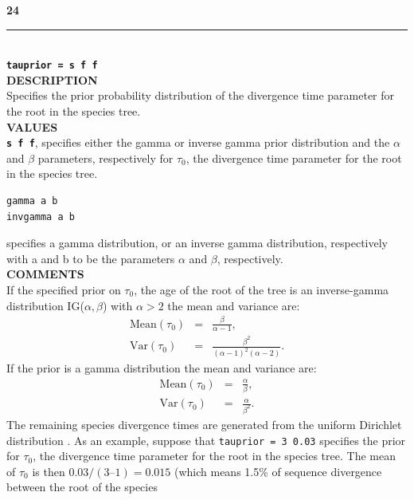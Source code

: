 \documentclass[a4paper]{book}
\numberwithin{equation}{section} \renewcommand{\baselinestretch}{0.55}
\begin{document}
\textbf{{\large 24}} \\
\noindent\rule{\textwidth}{0.8pt} \\
\textbf{{\Large \texttt{tauprior = s f f}}} \vspace{5pt}\\
\textbf{DESCRIPTION} \vspace{5pt}\\
Specifies the prior probability distribution of the divergence time
parameter for the root in the species tree.
\vspace{5pt}\\
\textbf{VALUES} \vspace{5pt}\\
\textbf{\texttt{s f f}}, specifies either the gamma or inverse gamma prior
distribution and the $\alpha$ and $\beta$ parameters,
respectively for $\tau_0$, the divergence time parameter for the root in the species
tree.
\begin{verbatim}
gamma a b
invgamma a b
\end{verbatim}
specifies a gamma distribution, or an inverse gamma distribution, respectively with
a and b to be the parameters $\alpha$ and $\beta$, respectively.
\vspace{5pt}\\
\textbf{COMMENTS} \vspace{5pt}\\
If the specified prior on $\tau_0$, the age of the root of the tree is an
inverse-gamma distribution IG($\alpha, \beta$) with $\alpha > 2$ the
mean and variance are:
\begin{eqnarray}
  \textrm{Mean}(\tau_0) & = & \frac{\beta}{\alpha - 1}, \nonumber \\
  \textrm{Var}(\tau_0) & = & \frac{\beta^2}{(\alpha - 1)^2 (\alpha - 2)}. \nonumber
\end{eqnarray}
If the prior is a gamma distribution the mean and variance are:
\begin{eqnarray}
  \textrm{Mean}(\tau_0) & = & \frac{\alpha}{\beta}, \nonumber \\
  \textrm{Var}(\tau_0) & = & \frac{\alpha}{\beta^2}. \nonumber
\end{eqnarray}
The remaining species divergence times are generated from the uniform
Dirichlet distribution \citep[][eq.~2]{Yang2010}.  As an example,
suppose that \texttt{tauprior = 3 0.03} specifies the prior for
$\tau_0$, the divergence time parameter for the root in the species
tree.  The mean of $\tau_0$ is then $0.03/(3 – 1) = 0.015$ (which
means 1.5\% of sequence divergence between the root of the species
\end{document}
